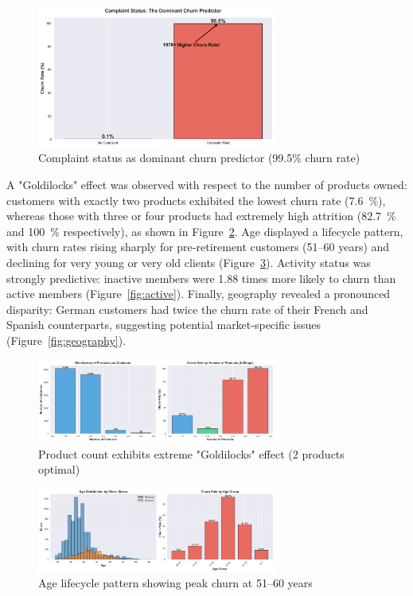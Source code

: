 \documentclass[12pt]{article}
\begin{document}
\begin{figure}[H]
\centering
\includegraphics[width=0.7\textwidth]{img/07_complaint_impact.png}
\caption{Complaint status as dominant churn predictor (99.5\% churn rate)}
\label{fig:complaint}
\end{figure}

A "Goldilocks" effect was observed with respect to the number of products owned: customers with exactly two products exhibited the lowest churn rate (7.6~\%), whereas those with three or four products had extremely high attrition (82.7~\% and 100~\% respectively), as shown in Figure~\ref{fig:products}.  Age displayed a lifecycle pattern, with churn rates rising sharply for pre‑retirement customers (51–60 years) and declining for very young or very old clients (Figure~\ref{fig:age}).  Activity status was strongly predictive: inactive members were 1.88 times more likely to churn than active members (Figure~\ref{fig:active}).  Finally, geography revealed a pronounced disparity: German customers had twice the churn rate of their French and Spanish counterparts, suggesting potential market‑specific issues (Figure~\ref{fig:geography}).

\begin{figure}[H]
\centering
\includegraphics[width=0.7\textwidth]{img/04_products_churn_analysis.png}
\caption{Product count exhibits extreme "Goldilocks" effect (2 products optimal)}
\label{fig:products}
\end{figure}

\begin{figure}[H]
\centering
\includegraphics[width=0.7\textwidth]{img/03_age_distribution_churn.png}
\caption{Age lifecycle pattern showing peak churn at 51–60 years}
\label{fig:age}
\end{figure}
\end{document}
